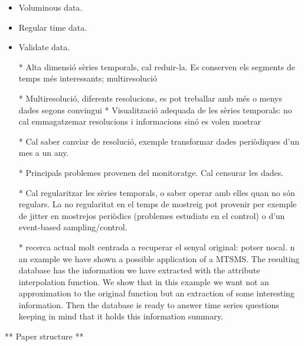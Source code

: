 \begin{itemize}

\item Voluminous data. 

\item Regular time data.

\item Validate data.

* Alta dimensió sèries temporals, cal reduir-la. Es conserven els segments de temps més interessants; multiresolució

* Multiresolució, diferents resolucions, es pot treballar amb més o menys dades segons convingui * Visualització adequada de les sèries temporals: no cal emmagatzemar resolucions i informacions sinó es volen mostrar

* Cal saber canviar de resolució, exemple transformar dades periòdiques d'un mes a un any.

* Principals problemes provenen del monitoratge. Cal censurar les dades.

* Cal regularitzar les sèries temporals, o saber operar amb elles quan no són regulars. La no regularitat en el temps de mostreig pot provenir per exemple de jitter en mostrejos periòdics (problemes estudiats en el control) o d'un event-based sampling/control.

* recerca actual molt centrada a recuperar el senyal original: potser nocal. n an example we have shown a possible application of a MTSMS. The
resulting database has the information we have extracted with the
attribute interpolation function. We show that in this example we want
not an approximation to the original function but an extraction of
some interesting information. Then the database is ready to answer
time series questions keeping in mind that it holds this information
summary.

\end{itemize}





** Paper structure **








